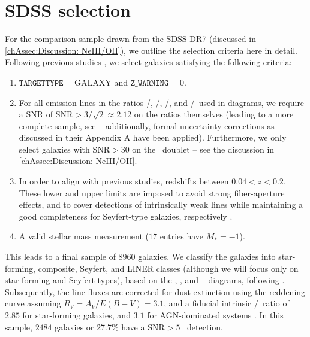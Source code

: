 \section{SDSS selection}
\label{appAsec:SDSS selection}

For the comparison sample drawn from the SDSS DR7 (discussed in \cref{chAssec:Discussion: NeIII/OII}), we outline the selection criteria here in detail. Following previous studies \citep[e.g.][]{2006MNRAS.372..961K, 2014ApJ...788...88J, 2016MNRAS.456.3354F}, we select galaxies satisfying the following criteria:
\begin{enumerate}[label=(\roman*)]
    \item $\mathtt{TARGETTYPE} = \mathrm{GALAXY}$ and $\mathtt{Z\_WARNING} = 0$.
    \item For all emission lines in the ratios \OIIIf/\Hbeta, \NII/\Halpha, \SII/\Halpha, and \OI/\Halpha\ used in  diagrams, we require a SNR of $\text{SNR} > 3/\sqrt{2} \approx 2.12$ on the ratios themselves (leading to a more complete sample, see \citet{2014ApJ...788...88J} -- additionally, formal uncertainty corrections as discussed in their Appendix A have been applied). Furthermore, we only select galaxies with $\text{SNR} > 30$ on the \OII\ doublet -- see the discussion in \cref{chAssec:Discussion: NeIII/OII}.
    \item In order to align with previous studies, redshifts between $0.04 < z < 0.2$. These lower and upper limits are imposed to avoid strong fiber-aperture effects, and to cover detections of intrinsically weak lines while maintaining a good completeness for Seyfert-type galaxies, respectively \citep[e.g.][]{2014ApJ...788...88J}.
    \item A valid stellar mass measurement ($17$ entries have $M_* = -1$).
\end{enumerate}
This leads to a final sample of $8960$ galaxies. We classify the galaxies into star-forming, composite, Seyfert, and LINER classes (although we will focus only on star-forming and Seyfert types), based on the \NII, \SII, and \OI\  diagrams, following \citet{2006MNRAS.372..961K}. Subsequently, the line fluxes are corrected for dust extinction using the \citet{1989ApJ...345..245C} reddening curve assuming $R_V = A_V/E(B-V) = 3.1$, and a fiducial intrinsic \Halpha/\Hbeta\ ratio of $2.85$ for star-forming galaxies, and $3.1$ for AGN-dominated systems \citep[for case-B recombination at $T = 10^4 \, \mathrm{K}$ and $n_e \sim 10^2$-$10^4 \, \mathrm{cm^{-3}}$, see][]{2006MNRAS.372..961K}. In this sample, $2484$ galaxies or 27.7\% have a $\text{SNR} > 5$ \NeIII\ detection.


